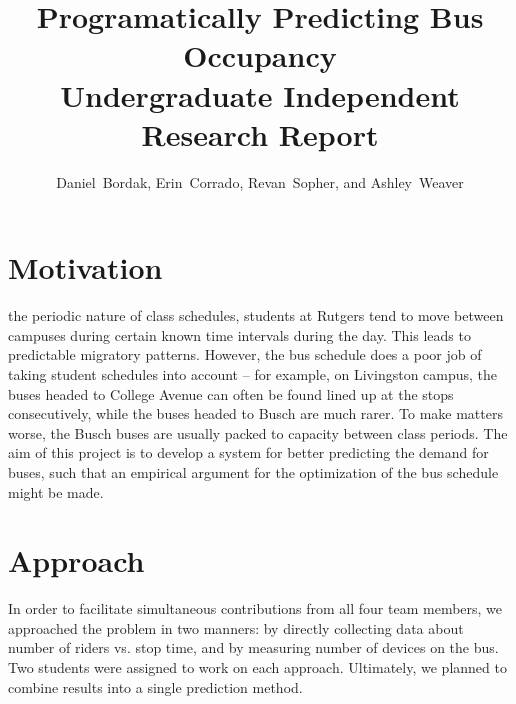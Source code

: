 \documentclass[12pt,journal,compsoc]{IEEEtran}
\begin{document}
\title{Programatically Predicting Bus Occupancy\\
{\large Undergraduate Independent Research Report}}
\author{Daniel~Bordak, Erin~Corrado, Revan~Sopher, and Ashley~Weaver}


\maketitle

\section{Motivation}

the periodic nature of class schedules, students at Rutgers tend to move between campuses during certain known time intervals during the day.
This leads to predictable migratory patterns.
However, the bus schedule does a poor job of taking student schedules into account -- for example, on Livingston campus, the buses headed to College Avenue can often be found lined up at the stops consecutively, while the buses headed to Busch are much rarer.
To make matters worse, the Busch buses are usually packed to capacity between class periods.
The aim of this project is to develop a system for better predicting the demand for buses, such that an empirical argument for the optimization of the bus schedule might be made.

\section{Approach}

In order to facilitate simultaneous contributions from all four team members, we approached the problem in two manners: by directly collecting data about number of riders vs. stop time, and by measuring number of devices on the bus.
Two students were assigned to work on each approach.
Ultimately, we planned to combine results into a single prediction method.
\end{document}
